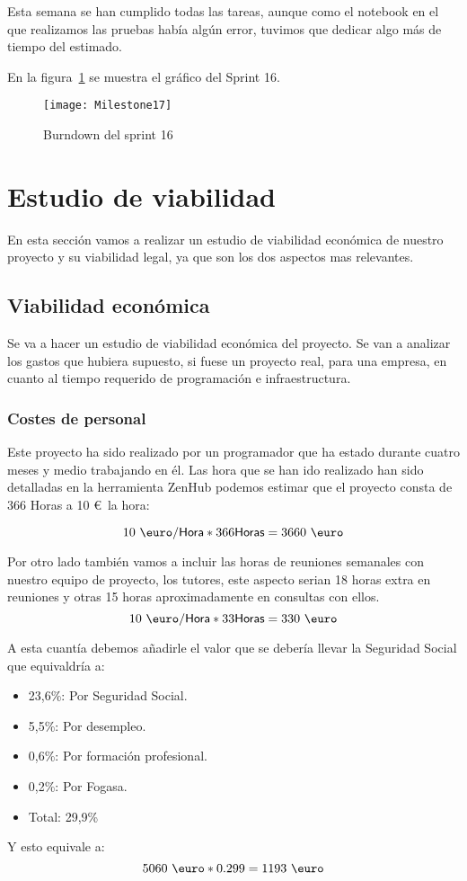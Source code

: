 Esta semana se han cumplido todas las tareas, aunque como el notebook en el que realizamos las pruebas había algún error, tuvimos que dedicar algo más de tiempo del estimado.

En la figura~\ref{fig:Milestone17} se muestra el gráfico del Sprint 16.

\begin{figure}
\centering
\texttt{[image: Milestone17]}
\caption{Burndown del sprint 16}
\label{fig:Milestone17}
\end{figure}

\section{Estudio de viabilidad}
En esta sección vamos a realizar un estudio de viabilidad económica de nuestro proyecto y su viabilidad legal, ya que son los dos aspectos mas relevantes.
\subsection{Viabilidad económica}
Se va a hacer un estudio de viabilidad económica del proyecto. Se van a analizar los gastos que hubiera supuesto, si fuese un proyecto real, para una empresa, en cuanto al tiempo requerido de programación e infraestructura.
\subsubsection{Costes de personal}
Este proyecto ha sido realizado por un programador que ha estado durante cuatro meses y medio trabajando en él.
Las hora que se han ido realizado han sido detalladas en la herramienta ZenHub podemos estimar que el proyecto consta de 366 Horas a 10 \euro~la hora:

\[10~{\mbox{\euro}} /\textsf{Hora}*366\textsf{Horas}=3660~{\mbox{\euro}}\]

Por otro lado también vamos a incluir las horas de reuniones semanales con nuestro equipo de proyecto, los tutores, este aspecto serian 18 horas extra en reuniones y otras 15 horas aproximadamente en consultas con ellos.
\[10~{\mbox{\euro}} /\textsf{Hora}*33\textsf{Horas}=330 ~{\mbox{\euro}} \]

A esta cuantía debemos añadirle el valor que se debería llevar la Seguridad Social que equivaldría a:
\begin{itemize}
\item 23,6\%: Por Seguridad Social.
\item 5,5\%: Por desempleo.
\item 0,6\%: Por formación profesional.
\item 0,2\%: Por Fogasa.
\item Total: 29,9\% 
\end{itemize}
Y esto equivale a: 
\[5060~{\mbox{\euro}}*0.299=1193~{\mbox{\euro}}\]

